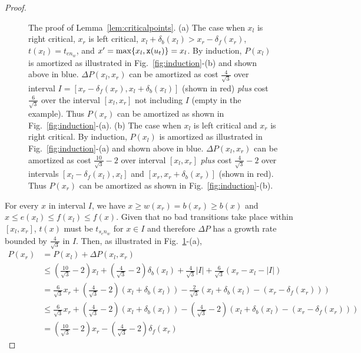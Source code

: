 \begin{proof}
\begin{figure}[!b]
\proofB

\caption{The proof of Lemma~\ref{lem:criticalpoints}. (a) The case when
$x_l$ is right critical, $x_r$ is left critical,
$x_l+\delta_b(x_l) > x_r-\delta_f(x_r)$, $t(x_l) = t_{en_w}$, and
$x' = \max\{x_l, {\tt x}(u_t)\} = x_l$. By induction,
$P(x_l)$ is amortized as illustrated in Fig.~\ref{fig:induction}-(b) and shown
above in blue. $\Delta P(x_l,x_r)$ can be amortized as cost 
$\frac{4}{\sqrt{3}}$ over interval 
$I=[x_r-\delta_f(x_r),x_l+\delta_b(x_l)]$ (shown in red) {\em plus} cost 
$\frac{6}{\sqrt{3}}$
over the interval $[x_l,x_r]$ not including $I$ (empty in the example). 
Thus $P(x_r)$ can be amortized as shown in Fig.~\ref{fig:induction}-(a).
(b) The case when $x_l$ is left critical and $x_r$ is right critical. By
induction, $P(x_l)$ is amortized as illustrated in Fig.~\ref{fig:induction}-(a)
and shown above in blue. $\Delta P(x_l,x_r)$ can be amortized as cost 
$\frac{10}{\sqrt{3}}-2$ over interval $[x_l,x_r]$ {\em plus} cost 
$\frac{4}{\sqrt{3}}-2$ over intervals $[x_l-\delta_f(x_l),x_l]$ and 
$[x_r,x_r+\delta_b(x_r)]$ (shown in red). Thus $P(x_r)$ can be amortized
as shown in Fig.~\ref{fig:induction}-(b).}
\label{fig:proofB}
\end{figure}


For every $x$ in interval $I$, %
we have
$x \geq w(x_r) = b(x_r) \geq b(x)$ and $x \leq e(x_l) \leq f(x_l) \leq f(x)$.
Given that no bad transitions take place
within $[x_l,x_r]$, $t(x)$ must be $t_{s_en_w}$ for $x \in I$ and therefore
$\Delta P$ has a growth rate bounded by $\frac{4}{\sqrt{3}}$ in $I$. Then,
as illustrated in Fig.~\ref{fig:proofB}-(a),
\begin{align*}
	P(x_r) & = P(x_l) + \Delta P(x_l,x_r) \\
	       & \leq \left(\frac{10}{\sqrt{3}}-2\right)x_l + \left(\frac{4}{\sqrt{3}}-2\right)\delta_b(x_l)
	       + \frac{4}{\sqrt{3}}|I| + \frac{6}{\sqrt{3}}(x_r-x_l-|I|) \\
	       & = \frac{6}{\sqrt{3}}x_r + \left(\frac{4}{\sqrt{3}}-2\right)(x_l + \delta_b(x_l))
	       - \frac{2}{\sqrt{3}}(x_l + \delta_b(x_l) - (x_r -\delta_f(x_r))) \\
	       & \leq \frac{6}{\sqrt{3}}x_r + \left(\frac{4}{\sqrt{3}}-2\right)(x_l + \delta_b(x_l))
	       - \left(\frac{4}{\sqrt{3}}-2\right)(x_l + \delta_b(x_l) - (x_r -\delta_f(x_r))) \\
               & = \left(\frac{10}{\sqrt{3}}-2\right)x_r - \left(\frac{4}{\sqrt{3}}-2\right)\delta_f(x_r)
\end{align*}


\end{proof}
